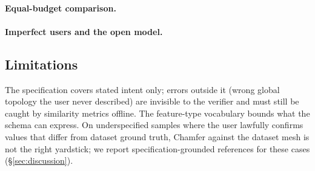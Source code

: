 \paragraph{Equal-budget comparison.}

\paragraph{Imperfect users and the open model.}

\subsection{Limitations}\label{sec:evaluation:limits}

The specification covers stated intent only; errors outside it (wrong global
topology the user never described) are invisible to the verifier and must
still be caught by similarity metrics offline. The feature-type vocabulary
bounds what the schema can express. On underspecified samples where the user
lawfully confirms values that differ from dataset ground truth, Chamfer
against the dataset mesh is not the right yardstick; we report
specification-grounded references for these cases
(\S\ref{sec:discussion}).
